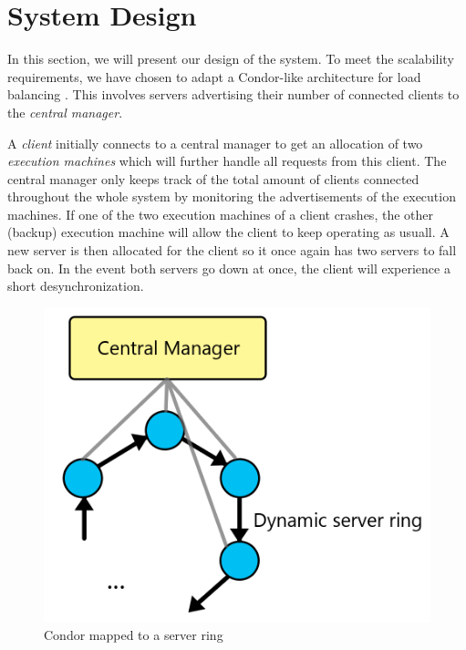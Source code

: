 \documentclass[a4paper,10pt]{article}
\begin{document}
\section{System Design}
\label{sec:design}

In this section, we will present our design of the system.
To meet the scalability requirements, we have chosen to adapt a Condor-like architecture for load balancing \cite{epema1996worldwide}.
This involves servers advertising their number of connected clients to the \emph{central manager}.

A \emph{client} initially connects to a central manager to get an allocation of two \emph{execution machines} which will further handle all requests from this client.
The central manager only keeps track of the total amount of clients connected throughout the whole system by monitoring the advertisements of the execution machines.
If one of the two execution machines of a client crashes, the other (backup) execution machine will allow the client to keep operating as usuall.
A new server is then allocated for the client so it once again has two servers to fall back on.
In the event both servers go down at once, the client will experience a short desynchronization.

\begin{figure}
\begin{framed}
    \begin{center}
        \includegraphics[width=\textwidth]{serverring.png}    
    \end{center}
    \caption{Condor mapped to a server ring}
    \label{fig:serverring}
\end{framed}
\end{figure}
\end{document}
